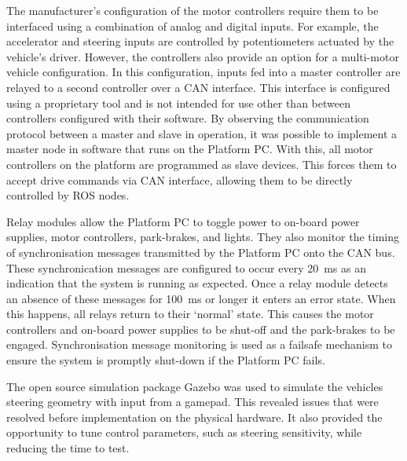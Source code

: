 \documentclass[preprint,authoryear,12pt]{elsarticle}
\begin{document}
        The manufacturer's configuration of the motor controllers require them to be interfaced using a combination of analog and digital inputs.
        For example, the accelerator and steering inputs are controlled by potentiometers actuated by the vehicle's driver.
        However, the controllers also provide an option for a multi-motor vehicle configuration.
        In this configuration, inputs fed into a master controller are relayed to a second controller over a CAN interface.
        This interface is configured using a proprietary tool and is not intended for use other than between controllers configured with their software.
        By observing the communication protocol between a master and slave in operation, it was possible to implement a master node in software that runs on the Platform PC.
        With this, all motor controllers on the platform are programmed as slave devices.
        This forces them to accept drive commands via CAN interface, allowing them to be directly controlled by ROS nodes.

        Relay modules allow the Platform PC to toggle power to on-board power supplies, motor controllers, park-brakes, and lights.
        They also monitor the timing of synchronisation messages transmitted by the Platform PC onto the CAN bus.
        These synchronication messages are configured to occur every \SI{20}{\milli\second} as an indication that the system is running as expected.
        Once a relay module detects an absence of these messages for \SI{100}{\milli\second} or longer it enters an error state.
        When this happens, all relays return to their `normal' state.
        This causes the motor controllers and on-board power supplies to be shut-off and the park-brakes to be engaged.
        Synchronisation message monitoring is used as a failsafe mechanism to ensure the system is promptly shut-down if the Platform PC fails.

        The open source simulation package Gazebo was used to simulate the vehicles steering geometry with input from a gamepad.
        This revealed issues that were resolved before implementation on the physical hardware.
        It also provided the opportunity to tune control parameters, such as steering sensitivity, while reducing the time to test.
\end{document}
